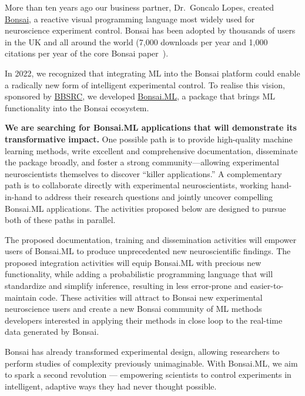 More than ten years ago our business partner, Dr.~Goncalo Lopes, created
\href{https://bonsai-rx.org/}{Bonsai}, a reactive visual programming
language most widely used for neuroscience experiment control.
%
Bonsai has been adopted by thousands of users in the UK and all around the
world (7,000 downloads per year and 1,000 citations per year of the core Bonsai
paper~\citep{lopesEtAl15}).

In 2022, we recognized that integrating ML into the Bonsai platform could
enable a radically new form of intelligent experimental control.
%
To realise this vision, sponsored by
\href{https://gow.bbsrc.ukri.org/grants/AwardDetails.aspx?FundingReference=BB\%2FW019132\%2F1}{BBSRC},
we developed \href{https://bonsai-rx.org/machinelearning}{Bonsai.ML}, a package
that brings ML functionality into the Bonsai ecosystem.

\textbf{We are searching for Bonsai.ML applications that will demonstrate its
transformative impact.}
%
One possible path is to provide high-quality machine learning methods, write
excellent and comprehensive documentation, disseminate the package broadly, and
foster a strong community—allowing experimental neuroscientists themselves to
discover “killer applications.”
%
A complementary path is to collaborate directly with experimental
neuroscientists, working hand-in-hand to address their research questions and
jointly uncover compelling Bonsai.ML applications.
%
The activities proposed below are designed to pursue both of these paths in
parallel.

The proposed documentation, training and dissemination activities will empower
users of Bonsai.ML to produce unprecedented new neuroscientific findings. The
proposed integration activities will equip Bonsai.ML with precious new
functionality, while adding a probabilistic programming language that will
standardize and simplify inference, resulting in less error-prone and
easier-to-maintain code.
%
These activities will attract to Bonsai new experimental neuroscience users and
create a new Bonsai community of ML methods developers interested in applying
their methods in close loop to the real-time data generated by Bonsai.

Bonsai has already transformed experimental design, allowing researchers to
perform studies of complexity previously unimaginable. With Bonsai.ML, we aim
to spark a second revolution — empowering scientists to control experiments in
intelligent, adaptive ways they had never thought possible.
